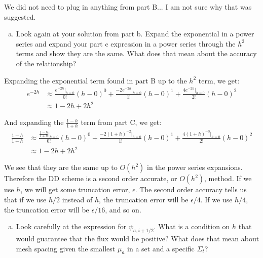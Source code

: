 \documentclass[10pt]{article}
\begin{document}
We did not need to plug in anything from part B... I am not sure why that was suggested.

%
%
%

\vspace{10pt}
\begin{enumerate}[(d)]
\item Look again at your solution from part b. Expand the exponential in a power series and expand your part c expression in a power series through the $h^2$ terms and show they are the same. What does that mean about the accuracy of the relationship?
\end{enumerate}

Expanding the exponential term found in part B up to the $h^2$ term, we get:
%
\begin{align*}
    e^{-2h} &\approx \frac{e^{-2h}|_{h=0}}{0!}(h-0)^0 + \frac{-2e^{-2h}|_{h=0}}{1!}(h-0)^1 + \frac{4e^{-2h}|_{h=0}}{2!}(h-0)^2 \\
    &\approx 1 - 2h + 2h^2
\end{align*}

And expanding the $\frac{1-h}{1+h}$ term from part C, we get:
%
\begin{align*}
    \frac{1-h}{1+h} &\approx \frac{\frac{1-h}{1+h}|_{h=0}}{0!}(h-0)^0 + \frac{-2(1+h)^{-2}|_{h=0}}{1!}(h-0)^1 + \frac{4(1+h)^{-3}|_{h=0}}{2!}(h-0)^2 \\
    &\approx 1-2h+2h^2
\end{align*}

We see that they are the same up to $O(h^2)$ in the power series expansions. Therefore the DD scheme is a second order accurate, or $O(h^2)$, method. If we use $h$, we will get some truncation error, $\epsilon$. The second order accuracy tells us that if we use $h/2$ instead of $h$, the truncation error will be $\epsilon/4$. If we use $h/4$, the truncation error will be $\epsilon/16$, and so on.

%
%
%

\vspace{10pt}
\begin{enumerate}[(e)]
\item Look carefully at the expression for
$\psi_{a,i+1/2}$. What is a condition on $h$ that would guarantee that the flux would be positive? What does that mean about mesh spacing given the smallest $\mu_a$ in a set and a specific $\Sigma_t$?
\end{enumerate}
\end{document}
